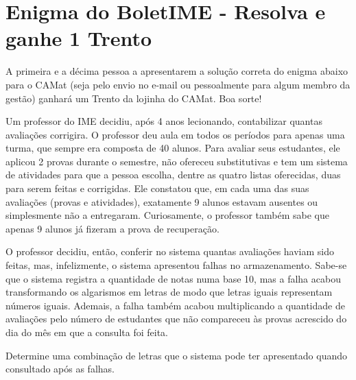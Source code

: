 \section*{Enigma do BoletIME - Resolva e ganhe 1 Trento}

A primeira e a décima pessoa a apresentarem a solução correta do enigma abaixo para o CAMat (seja pelo envio no e-mail ou pessoalmente para algum membro da gestão) ganhará um Trento da lojinha do CAMat. Boa sorte!

Um professor do IME decidiu, após 4 anos lecionando, contabilizar quantas avaliações corrigira. O professor deu aula em todos os períodos para apenas uma turma, que sempre era composta de 40 alunos. Para avaliar seus estudantes, ele aplicou 2 provas durante o semestre, não ofereceu substitutivas e tem um sistema de atividades para que a pessoa escolha, dentre as quatro listas oferecidas, duas para serem feitas e corrigidas. Ele constatou que, em cada uma das suas avaliações (provas e atividades), exatamente 9 alunos estavam ausentes ou simplesmente não a entregaram. Curiosamente, o professor também sabe que apenas 9 alunos já fizeram a prova de recuperação.

O professor decidiu, então, conferir no sistema quantas avaliações haviam sido feitas, mas, infelizmente, o sistema apresentou falhas no armazenamento. Sabe-se que o sistema registra a quantidade de notas numa base 10, mas a falha acabou transformando os algarismos em letras de modo que letras iguais representam números iguais. Ademais, a falha também acabou multiplicando a quantidade de avaliações pelo número de estudantes que não compareceu às provas acrescido do dia do mês em que a consulta foi feita.

Determine uma combinação de letras que o sistema pode ter apresentado quando consultado após as falhas.